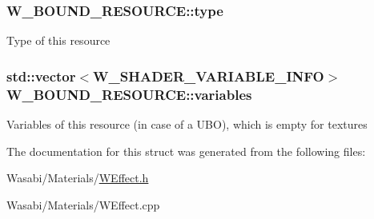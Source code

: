 \subsubsection[{\texorpdfstring{type}{type}}]{ W\+\_\+\+B\+O\+U\+N\+D\+\_\+\+R\+E\+S\+O\+U\+R\+C\+E\+::type}\hypertarget{struct_w___b_o_u_n_d___r_e_s_o_u_r_c_e_aba210bfb28ce06d4ab333eeab7877222}{}\label{struct_w___b_o_u_n_d___r_e_s_o_u_r_c_e_aba210bfb28ce06d4ab333eeab7877222}
Type of this resource 
\subsubsection[{\texorpdfstring{variables}{variables}}]{\setlength{\rightskip}{0pt plus 5cm}std\+::vector$<${\bf W\+\_\+\+S\+H\+A\+D\+E\+R\+\_\+\+V\+A\+R\+I\+A\+B\+L\+E\+\_\+\+I\+N\+FO}$>$ W\+\_\+\+B\+O\+U\+N\+D\+\_\+\+R\+E\+S\+O\+U\+R\+C\+E\+::variables}\hypertarget{struct_w___b_o_u_n_d___r_e_s_o_u_r_c_e_a700e968f2052b08e3b2747c168f91f47}{}\label{struct_w___b_o_u_n_d___r_e_s_o_u_r_c_e_a700e968f2052b08e3b2747c168f91f47}
Variables of this resource (in case of a U\+BO), which is empty for textures 

The documentation for this struct was generated from the following files\+:\begin{DoxyCompactItemize}
\item 
Wasabi/\+Materials/\hyperlink{_w_effect_8h}{W\+Effect.\+h}\item 
Wasabi/\+Materials/W\+Effect.\+cpp\end{DoxyCompactItemize}
